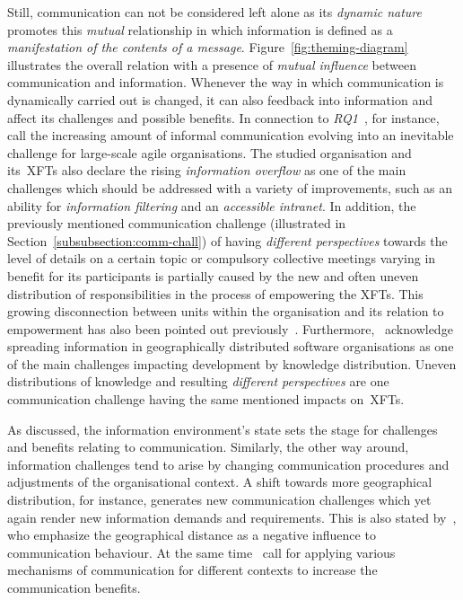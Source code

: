 Still, communication can not be considered left alone as its \emph{dynamic nature}  promotes this \emph{mutual} relationship in which information is defined as a \emph{manifestation of the contents of a message}.
Figure~\ref{fig:theming-diagram} illustrates the overall relation with a presence of \emph{mutual influence} between communication and information. Whenever the way in which communication is dynamically carried out is changed, it can also feedback into information and affect its challenges and possible benefits. In connection to \textit{RQ1}~\citet{pikkarainen2008impactagilecommunication}, for instance, call the increasing amount of informal communication evolving into an inevitable challenge for large-scale agile organisations. The studied organisation and its~\acp{XFT} also declare the rising \emph{information overflow} as one of the main challenges which should be addressed with a variety of improvements, such as an ability for \emph{information filtering} and an \emph{accessible intranet}. In addition, the previously mentioned communication challenge (illustrated in Section~\ref{subsubsection:comm-chall}) of having \emph{different perspectives} towards the level of details on a certain topic or compulsory collective meetings varying in benefit for its participants is partially caused by the new and often uneven distribution of responsibilities in the process of empowering the \acp{XFT}. This growing disconnection between units within the organisation and its relation to empowerment has also been pointed out previously~\citep{millslimitsempowerment, tessemindividualempoqerment}. Furthermore,~\citet{ovaska2003architecture} acknowledge spreading information in geographically distributed software organisations as one of the main challenges impacting development by knowledge distribution. Uneven distributions of knowledge and resulting \textit{different perspectives} are one communication challenge having the same mentioned impacts on~\acp{XFT}.   

As discussed, the information environment's state sets the stage for challenges and benefits relating to communication. Similarly, the other way around, information challenges tend to arise by changing communication procedures and adjustments of the organisational context. A shift towards more geographical distribution, for instance, generates new communication challenges which yet again render new information demands and requirements. This is also stated by~\citet{kraut1995coordinationinsd}, who emphasize the geographical distance as a negative influence to communication behaviour. At the same time~\citet{rbs2012softwarearchitecture} call for applying various mechanisms of communication for different contexts to increase the communication benefits.


